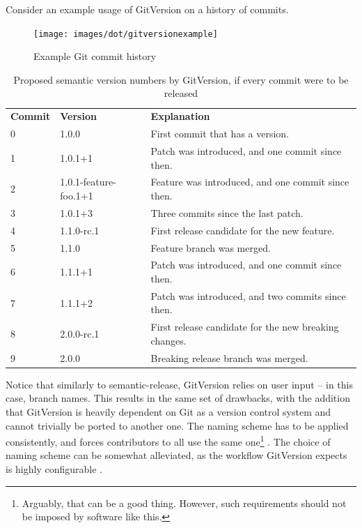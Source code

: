\documentclass{l4proj}
\begin{document}
Consider an example usage of GitVersion on a history of commits.

\begin{figure}[H]
\centering
\texttt{[image: images/dot/gitversionexample]}
\caption{Example Git commit history}
\end{figure}

\begin{table}[H]
\centering
\begin{tabular}{|l|l|l|}
\textbf{Commit} & \textbf{Version} & \textbf{Explanation}                              \\
0      & 1.0.0                 & First commit that has a version.                      \\
1      & 1.0.1+1               & Patch was introduced, and one commit since then.      \\
2      & 1.0.1-feature-foo.1+1 & Feature was introduced, and one commit since then.    \\
3      & 1.0.1+3               & Three commits since the last patch.                   \\
4      & 1.1.0-rc.1            & First release candidate for the new feature.          \\
5      & 1.1.0                 & Feature branch was merged.                            \\
6      & 1.1.1+1               & Patch was introduced, and one commit since then.      \\
7      & 1.1.1+2               & Patch was introduced, and two commits since then.     \\
8      & 2.0.0-rc.1            & First release candidate for the new breaking changes. \\
9      & 2.0.0                 & Breaking release branch was merged.
\end{tabular}
\caption{Proposed semantic version numbers by GitVersion, if every
commit were to be released}
\end{table}

Notice that similarly to semantic-release, GitVersion relies on user
input -- in this case, branch names. This results in the same set of
drawbacks, with the addition that GitVersion is heavily dependent on
Git as a version control system and cannot trivially be ported to
another one. The naming scheme has to be applied consistently, and
forces contributors to all use the same one\footnote{Arguably, that
can be a good thing. However, such requirements should not be imposed
by software like this.} . The choice of naming scheme can be somewhat
alleviated, as the workflow GitVersion expects is highly configurable
\cite{GitVersionConfiguration}.
\end{document}
